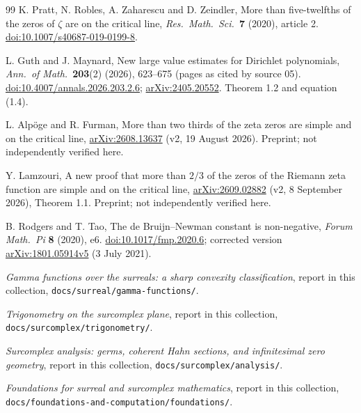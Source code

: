 \documentclass[11pt,a4paper]{article}
\numberwithin{equation}{section}
\theoremstyle{definition}
\theoremstyle{remark}
\begin{document}
\begin{thebibliography}{99}
K. Pratt, N. Robles, A. Zaharescu and D. Zeindler, More than five-twelfths of
the zeros of $\zeta$ are on the critical line, \emph{Res.\ Math.\ Sci.}\
\textbf{7} (2020), article 2.
\href{https://doi.org/10.1007/s40687-019-0199-8}{doi:10.1007/s40687-019-0199-8}.

L. Guth and J. Maynard, New large value estimates for Dirichlet polynomials,
\emph{Ann.\ of Math.}\ \textbf{203}(2) (2026), 623--675 (pages as cited by
source 05).
\href{https://doi.org/10.4007/annals.2026.203.2.6}{doi:10.4007/annals.2026.203.2.6};
\href{https://arxiv.org/abs/2405.20552}{arXiv:2405.20552}. Theorem 1.2 and
equation (1.4).

L. Alp\"oge and R. Furman, More than two thirds of the zeta zeros are simple and
on the critical line, \href{https://arxiv.org/abs/2608.13637}{arXiv:2608.13637}
(v2, 19 August 2026). Preprint; not independently verified here.

Y. Lamzouri, A new proof that more than $2/3$ of the zeros of the Riemann zeta
function are simple and on the critical line,
\href{https://arxiv.org/abs/2609.02882}{arXiv:2609.02882} (v2, 8 September
2026), Theorem 1.1. Preprint; not independently verified here.

B. Rodgers and T. Tao, The de Bruijn--Newman constant is non-negative,
\emph{Forum Math.\ Pi} \textbf{8} (2020), e6.
\href{https://doi.org/10.1017/fmp.2020.6}{doi:10.1017/fmp.2020.6};
corrected version \href{https://arxiv.org/abs/1801.05914}{arXiv:1801.05914v5}
(3 July 2021).

\emph{Gamma functions over the surreals: a sharp convexity classification},
report in this collection, \texttt{docs/surreal/gamma-functions/}.

\emph{Trigonometry on the surcomplex plane}, report in this collection,
\texttt{docs/surcomplex/trigonometry/}.

\emph{Surcomplex analysis: germs, coherent Hahn sections, and infinitesimal zero
geometry}, report in this collection, \texttt{docs/surcomplex/analysis/}.

\emph{Foundations for surreal and surcomplex mathematics}, report in this collection,
\texttt{docs/foundations-and-computation/foundations/}.

\end{thebibliography}
\end{document}
